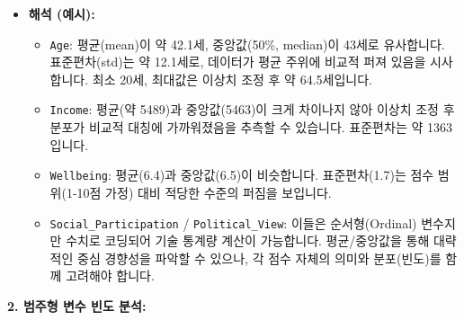\documentclass[
  letterpaper,
]{book}
\providecommand{\tightlist}{%
  \setlength{\itemsep}{0pt}\setlength{\parskip}{0pt}}
\begin{document}
\begin{itemize}
\tightlist
\item
  \textbf{해석 (예시):}

  \begin{itemize}
  \tightlist
  \item
    \texttt{Age}: 평균(mean)이 약 42.1세, 중앙값(50\%, median)이 43세로
    유사합니다. 표준편차(std)는 약 12.1세로, 데이터가 평균 주위에 비교적
    퍼져 있음을 시사합니다. 최소 20세, 최대값은 이상치 조정 후 약
    64.5세입니다.
  \item
    \texttt{Income}: 평균(약 5489)과 중앙값(5463)이 크게 차이나지 않아
    이상치 조정 후 분포가 비교적 대칭에 가까워졌음을 추측할 수 있습니다.
    표준편차는 약 1363입니다.
  \item
    \texttt{Wellbeing}: 평균(6.4)과 중앙값(6.5)이 비슷합니다.
    표준편차(1.7)는 점수 범위(1-10점 가정) 대비 적당한 수준의 퍼짐을
    보입니다.
  \item
    \texttt{Social\_Participation} / \texttt{Political\_View}: 이들은
    순서형(Ordinal) 변수지만 수치로 코딩되어 기술 통계량 계산이
    가능합니다. 평균/중앙값을 통해 대략적인 중심 경향성을 파악할 수
    있으나, 각 점수 자체의 의미와 분포(빈도)를 함께 고려해야 합니다.
  \end{itemize}
\end{itemize}

\textbf{2. 범주형 변수 빈도 분석:}
\end{document}
